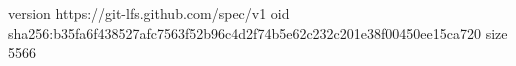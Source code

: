 version https://git-lfs.github.com/spec/v1
oid sha256:b35fa6f438527afc7563f52b96c4d2f74b5e62c232c201e38f00450ee15ca720
size 5566
